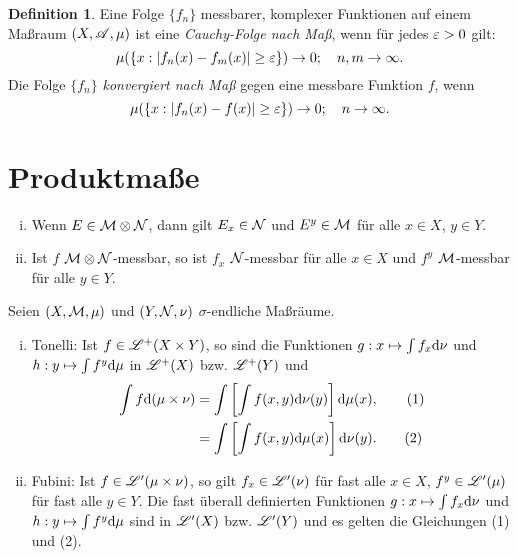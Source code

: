 \documentclass[
 a4paper,
 10pt,
 parskip=half
 ]{scrartcl}
\theoremstyle{plain}
\theoremstyle{definition}
\newtheorem*{defn}{Definition}
\numberwithin{equation}{section}
\begin{document}
\begin{defn}
 Eine Folge $\{f_n\}$ messbarer, komplexer Funktionen auf einem Maßraum $(X,\mathscr{A},\mu)$ ist eine \emph{Cauchy-Folge nach Maß}, wenn für jedes $\varepsilon > 0$ gilt:
 \[ \mu( \{ x : | f_n(x) - f_m(x) | \ge \varepsilon \} ) \to 0; \quad n, m \to \infty. \]
 Die Folge $\{ f_n \}$ \emph{konvergiert nach Maß} gegen eine messbare Funktion $f$, wenn
 \[ \mu( \{ x : | f_n(x) - f(x) | \ge \varepsilon \} ) \to 0; \quad n \to \infty. \]
\end{defn}

\section*{Produktmaße}
\begin{lem}
 \begin{enumerate}[(i)]
  \item Wenn $E \in \mathcal{M} \otimes \mathcal{N}$, dann gilt $E_x \in \mathcal{N}$ und $E^y \in \mathcal{M}$ für alle $x \in X$, $y \in Y$.
  \item Ist $f$ $\mathcal{M} \otimes \mathcal{N}$-messbar, so ist $f_x$ $\mathcal{N}$-messbar für alle $x \in X$ und $f^y$ $\mathcal{M}$-messbar für alle $y \in Y$.
 \end{enumerate}
\end{lem}

\begin{thm}
 Seien $(X,\mathcal{M},\mu)$ und $(Y,\mathcal{N},\nu)$ $\sigma$-endliche Maßräume.
 
 \begin{enumerate}[(i)]
  \item Tonelli: Ist $f \in \mathscr{L}^+(X \times Y)$, so sind die Funktionen $g:x \mapsto \int f_x \mathrm{d} \nu$ und $h:y \mapsto \int f^y \mathrm{d} \mu$ in $\mathscr{L}^+(X)$ bzw. $\mathscr{L}^+(Y)$ und
  \begin{align*}
   \int f \mathrm{d} (\mu \times \nu)
     &= \int \left[ \int f(x,y) \mathrm{d} \nu(y) \right] \mathrm{d} \mu(x), \tag{1} \\
     &= \int \left[ \int f(x,y) \mathrm{d} \mu(x) \right] \mathrm{d} \nu(y). \tag{2}
  \end{align*}
  \item Fubini: Ist $f \in \mathscr{L}'(\mu \times \nu)$, so gilt $f_x \in \mathscr{L}'(\nu)$ für fast alle $x \in X$, $f^y \in \mathscr{L}'(\mu)$ für fast alle $y \in Y$. Die fast überall definierten Funktionen $g:x \mapsto \int f_x \mathrm{d} \nu$ und $h:y \mapsto \int f^y \mathrm{d} \mu$ sind in $\mathscr{L}'(X)$ bzw. $\mathscr{L}'(Y)$ und es gelten die Gleichungen (1) und (2).
 \end{enumerate}
\end{thm}
\end{document}
